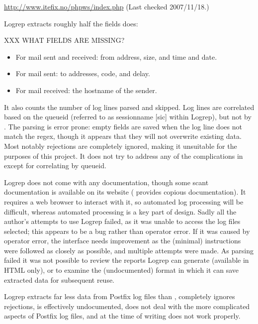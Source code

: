 \noindent{}\url{http://www.itefix.no/phpws/index.php} \newline{}
(Last checked 2007/11/18.)

Logrep extracts roughly half the fields \parsername{} does:

XXX WHAT FIELDS ARE MISSING\@?

\begin{itemize}

    \item For mail sent and received: from address, size, and time and
        date.

    \item For mail sent: to addresses, \SMTP{} code, and delay.

    \item For mail received: the hostname of the sender.

\end{itemize}

It also counts the number of log lines parsed and skipped.  Log lines are
correlated based on the queueid (referred to as sessionname [sic] within
Logrep), but not by \pid{}.  The parsing is error prone: empty fields are
saved when the log line does not match the regex, though it appears that
they will not overwrite existing data.  Most notably rejections are
completely ignored, making it unsuitable for the purposes of this project.
It does not try to address any of the complications in
 except for correlating by queueid.

Logrep does not come with any documentation, though some scant
documentation is available on its website (\parsername{} provides copious
documentation).  It requires a web browser to interact with it, so
automated log processing will be difficult, whereas automated processing is
a key part of \parsernames{} design.  Sadly all the author's attempts to
use Logrep failed, as it was unable to access the log files selected; this
appears to be a bug rather than operator error.  If it was caused by
operator error, the interface needs improvement as the (minimal)
instructions were followed as closely as possible, and multiple attempts
were made.  As parsing failed it was not possible to review the reports
Logrep can generate (available in HTML only), or to examine the
(undocumented) format in which it can save extracted data for subsequent
reuse.

Logrep extracts far less data from Postfix log files than \parsername{},
completely ignores rejections, is effectively undocumented, does not deal
with the more complicated aspects of Postfix log files, and at the time of
writing does not work properly.

